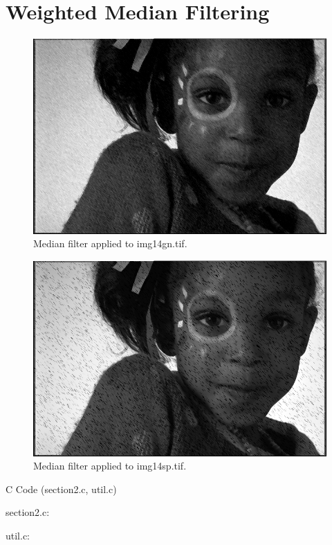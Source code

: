 \documentclass{article}
\begin{document}
\section{Weighted Median Filtering}
\begin{figure}[H]
    \centering
    \includegraphics[width=1\textwidth]{../2-img14gn-corrected.png}
    \caption{Median filter applied to img14gn.tif.}
\end{figure}
\begin{figure}[H]
    \centering
    \includegraphics[width=1\textwidth]{../2-img14sp-corrected.png}
    \caption{Median filter applied to img14sp.tif.}
\end{figure}

\large{C Code (section2.c, util.c)}

section2.c:


util.c:

\end{document}
